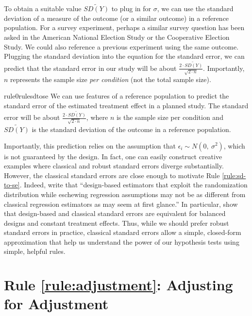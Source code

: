 \documentclass[12pt]{article}
\begin{document}
To obtain a suitable value $\widetilde{SD(Y)}$ to plug in for
$\sigma$, we can use the standard deviation of a measure of the
outcome (or a similar outcome) in a reference population. 
For a survey experiment, perhaps a similar survey question has been asked in the American National Election Study or the Cooperative Election Study. 
We could also reference a previous experiment using the same outcome. 
Plugging the standard deviation into the equation for the standard error, we can predict that the standard error in our study will be about $\frac{2 \cdot \widetilde{SD(Y)}}{\sqrt{2 \cdot n}}$. 
Importantly, $n$ represents the sample size \textit{per condition} (not the total sample size).

\begin{restatable}[SD to SE]{rule0}{rulesdtose}
\label{rule:sd-to-se}
We can use features of a reference population to predict the standard error of the estimated treatment effect in a planned study. The standard error will be about $\frac{2 \cdot \widetilde{SD(Y)}}{\sqrt{2 \cdot n}}$, where $n$ is the sample size per condition and $\widetilde{SD(Y)}$ is the standard deviation of the outcome in a reference population.
\end{restatable}

Importantly, this prediction relies on the assumption that $\epsilon_{i} \sim N\left( 0,\ \sigma^{2} \right)$, which is not guaranteed by the design. 
In fact, one can easily construct creative examples where classical and robust standard errors diverge substantially. 
However, the classical standard errors are close enough
to motivate Rule \ref{rule:sd-to-se}. 
Indeed, \citet[370]{Samii2012} write that ``design-based estimators that exploit the randomization distribution while eschewing regression assumptions may not be as different from classical regression estimators as may seem at first glance.'' 
In particular, \citet[370]{Samii2012} show that design-based and classical
standard errors are equivalent for balanced designs and constant
treatment effects. 
Thus, while we should prefer robust standard errors in practice, classical standard errors allow a simple, closed-form approximation that help us understand the power of our hypothesis tests using simple, helpful rules.

\section*{Rule \ref{rule:adjustment}: Adjusting for Adjustment}
\end{document}
